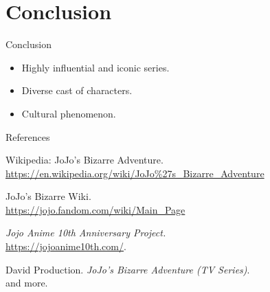 \documentclass[presentation]{beamer}
\begin{document}
\section{Conclusion}
\begin{frame}{Conclusion}
	\begin{itemize}
		\item Highly influential and iconic series.
		      \vspace{1em}
		\item Diverse cast of characters.
		      \vspace{1em}
		\item Cultural phenomenon.
	\end{itemize}
\end{frame}
\begin{frame}{References}
	\begin{thebibliography}{9}
		Wikipedia: JoJo's Bizarre Adventure.
		\\\url{https://en.wikipedia.org/wiki/JoJo\%27s\_Bizarre\_Adventure}
		    
		JoJo's Bizarre Wiki.
		\\\url{https://jojo.fandom.com/wiki/Main\_Page}
		    
		\emph{Jojo Anime 10th Anniversary Project.}\\
		\url{https://jojoanime10th.com/}.
		    
		David Production. 
		\textit{JoJo's Bizarre Adventure (TV Series)}.\\
		and more.
	\end{thebibliography}
\end{frame}
\end{document}
